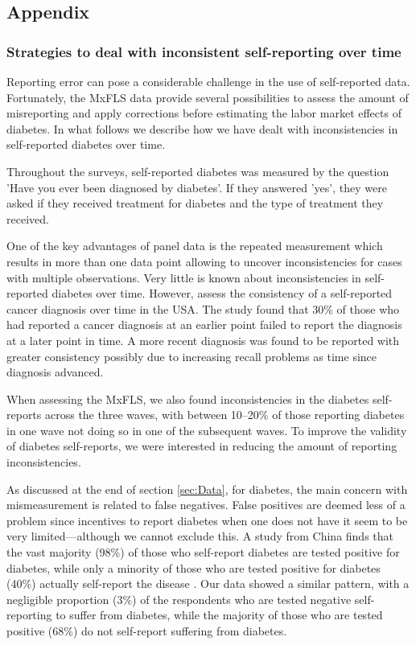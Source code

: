 \documentclass[12pt,english]{article}
\begin{document}
\begin{appendix}
\clearpage


\part*{\label{part:Appendix}Appendix}

\section{\label{sec:Appendix}Strategies to deal with inconsistent self-reporting over time}

Reporting error can pose a considerable challenge in the use of self-reported data. Fortunately, the \ac{MxFLS} data provide several possibilities to assess the amount of misreporting and apply corrections before estimating the labor market effects of diabetes. In what follows we describe how we have dealt with inconsistencies in self-reported diabetes over time.

Throughout the surveys, self-reported diabetes was measured by the question 'Have you ever been diagnosed by diabetes'. If they answered 'yes', they were asked if they received treatment for diabetes and the type of treatment they received.

One of the key advantages of panel data is the repeated measurement which results in more than one data point allowing to uncover inconsistencies for cases with multiple observations. Very little is known about inconsistencies in self-reported diabetes over time. However, \textcite{Zajacova2010} assess the consistency of a self-reported cancer diagnosis over time in the USA. The study found that 30\% of those who had reported a cancer diagnosis at an earlier point failed to report the diagnosis at a later point in time. A more recent diagnosis was found to be reported with greater consistency possibly due to increasing recall problems as time since diagnosis advanced.

When assessing the \ac{MxFLS}, we also found inconsistencies in the diabetes self-reports across the three waves, with between 10--20\% of those reporting diabetes in one wave not doing so in one of the subsequent waves. To improve the validity of diabetes self-reports, we were interested in reducing the amount of reporting inconsistencies.

As discussed at the end of section \ref{sec:Data}, for diabetes, the main concern with mismeasurement is related to false negatives. False positives are deemed less of a problem since incentives to report diabetes when one does not have it seem to be very limited---although we cannot exclude this.  A study from China finds that the vast majority (98\%) of those who self-report diabetes are tested positive for diabetes, while only a minority  of those who are tested positive for diabetes (40\%) actually self-report the disease \parencite{Yuan2015}.  Our data showed a similar pattern, with a negligible proportion (3\%) of the respondents who are tested negative self-reporting to suffer from diabetes, while the majority of those who are tested positive (68\%) do not self-report suffering from diabetes.


\end{appendix}
\end{document}
